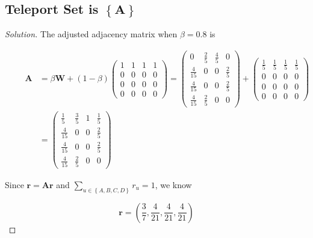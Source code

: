 \documentclass{article}
\newcommand{\set}[1]{\left\{#1\right\}}
\newenvironment{solution}{\begin{proof}[\noindent\it Solution]}{\end{proof}}
\newcommand{\bd}[1]{\boldsymbol{#1}}
\begin{document}
\subsection{Teleport Set is $\set{\bd{A}}$}
\vspace{1em}
\begin{solution}
    The adjusted adjacency matrix when $\beta=0.8$ is 

    \vspace{-1.5em}
    \begin{align*}
        \qquad \bd{A} & = \beta \bd{W} + \left(1-\beta\right)\left(
            \begin{array}{cccc}
                1 & 1 & 1 & 1 \\
                0 & 0 & 0 & 0 \\
                0 & 0 & 0 & 0 \\
                0 & 0 & 0 & 0
            \end{array}
        \right) = \left(
        \begin{array}{cccc}
            0 & \frac{2}{5} & \frac{4}{5} & 0 \\
            \frac{4}{15} & 0 & 0 & \frac{2}{5} \\
            \frac{4}{15} & 0 & 0 & \frac{2}{5} \\
            \frac{4}{15} & \frac{2}{5} & 0 & 0 
        \end{array}
    \right) + \left(
        \begin{array}{cccc}
            \frac{1}{5} & \frac{1}{5} & \frac{1}{5} & \frac{1}{5} \\
            0 & 0 & 0 & 0 \\
            0 & 0 & 0 & 0 \\
            0 & 0 & 0 & 0
        \end{array}
    \right) \\
    & = \left(
        \begin{array}{cccc}
            \frac{1}{5} & \frac{3}{5} & 1 & \frac{1}{5} \\
            \frac{4}{15} & 0 & 0 & \frac{2}{5} \\
            \frac{4}{15} & 0 & 0 & \frac{2}{5} \\
            \frac{4}{15} & \frac{2}{5} & 0 & 0 
        \end{array}
    \right)
    \end{align*}


    \hspace{2.6em}
    Since $\bd{r}=\bd{A}\bd{r}$ and $\sum_{u\in\set{A,B,C,D}} r_u=1$, we know
    
    \vspace{-0.5em}
    $$\bd{r} = \left( \dfrac{3}{7}, \dfrac{4}{21}, \dfrac{4}{21}, \dfrac{4}{21} \right)$$

    \vspace{-2.75em}
\end{solution}
\end{document}
